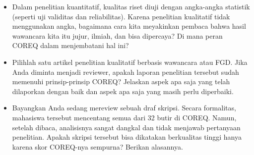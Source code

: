 \documentclass[
  indonesian,
  letterpaper,
  DIV=11,
  numbers=noendperiod]{scrreprt}
\providecommand{\tightlist}{%
  \setlength{\itemsep}{0pt}\setlength{\parskip}{0pt}}
\begin{document}
\begin{tcolorbox}[enhanced jigsaw, colframe=quarto-callout-important-color-frame, toptitle=1mm, breakable, leftrule=.75mm, arc=.35mm, toprule=.15mm, colback=white, colbacktitle=quarto-callout-important-color!10!white, bottomtitle=1mm, bottomrule=.15mm, titlerule=0mm, title=\textcolor{quarto-callout-important-color}{\faExclamation}\hspace{0.5em}{Refleksi \& Diskusi}, coltitle=black, left=2mm, opacitybacktitle=0.6, opacityback=0, rightrule=.15mm]

\begin{itemize}
\tightlist
\item
  Dalam penelitian kuantitatif, kualitas riset diuji dengan angka-angka
  statistik (seperti uji validitas dan reliabilitas). Karena penelitian
  kualitatif tidak menggunakan angka, bagaimana cara kita meyakinkan
  pembaca bahwa hasil wawancara kita itu jujur, ilmiah, dan bisa
  dipercaya? Di mana peran COREQ dalam menjembatani hal ini?
\item
  Pilihlah satu artikel penelitian kualitatif berbasis wawancara atau
  FGD. Jika Anda diminta menjadi reviewer, apakah laporan penelitian
  tersebut sudah memenuhi prinsip-prinsip COREQ? Jelaskan aspek apa saja
  yang telah dilaporkan dengan baik dan aspek apa saja yang masih perlu
  diperbaiki.
\item
  Bayangkan Anda sedang mereview sebuah draf skripsi. Secara formalitas,
  mahasiswa tersebut mencentang semua dari 32 butir di COREQ. Namun,
  setelah dibaca, analisisnya sangat dangkal dan tidak menjawab
  pertanyaan penelitian. Apakah skripsi tersebut bisa dikatakan
  berkualitas tinggi hanya karena skor COREQ-nya sempurna? Berikan
  alasannya.
\end{itemize}

\end{tcolorbox}
\end{document}
